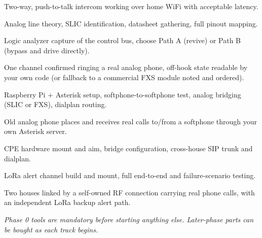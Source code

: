   {Two-way, push-to-talk intercom working over home WiFi with acceptable latency.}


  {Analog line theory, SLIC identification, datasheet gathering, full pinout mapping.}

  {Logic analyzer capture of the control bus, choose Path A (revive) or Path B (bypass and drive directly).}

  {One channel confirmed ringing a real analog phone, off-hook state readable by your own code (or fallback to a commercial FXS module noted and ordered).}


  {Raspberry Pi + Asterisk setup, softphone-to-softphone test, analog bridging (SLIC or FXS), dialplan routing.}

  {Old analog phone places and receives real calls to/from a softphone through your own Asterisk server.}


  {CPE hardware mount and aim, bridge configuration, cross-house SIP trunk and dialplan.}

  {LoRa alert channel build and mount, full end-to-end and failure-scenario testing.}

  {Two houses linked by a self-owned RF connection carrying real phone calls, with an independent LoRa backup alert path.}

\newpage

{\small\itshape\color{arligray} Phase 0 tools are mandatory before starting anything else. Later-phase parts can be bought as each track begins.}

